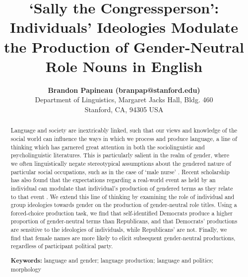 \documentclass[10pt,letterpaper]{article}
\title{`Sally the Congressperson': Individuals' Ideologies Modulate the Production of Gender-Neutral Role Nouns in English}
\author{{\large \bf Brandon Papineau (branpap@stanford.edu)} \\
	Department of Linguistics, Margaret Jacks Hall, Bldg. 460\\
	Stanford, CA, 94305 USA}
\begin{document}
	
	\maketitle
	
	\begin{abstract}
		Language and society are inextricably linked, such that our views and knowledge of the social world can influence the ways in which we process and produce language, a line of thinking which has garnered great attention in both the sociolinguistic and psycholinguistic literatures. This is particularly salient in the realm of gender, where we often linguistically negate stereotypical assumptions about the gendered nature of particular social occupations, such as in the case of `male nurse' \parencite{hellinger2001english}. Recent scholarship has also found that the expectations regarding a real-world event as held by an individual can modulate that individual's production of gendered terms as they relate to that event \parencite{von2020implicit,pozniak2021failures}. We extend this line of thinking by examining the role of individual and group ideologies towards gender on the production of gender-neutral role titles. Using a forced-choice production task, we find that self-identified Democrats produce a higher proportion of gender-neutral terms than Republicans, and that Democrats' productions are sensitive to the ideologies of individuals, while Republicans' are not. Finally, we find that female names are more likely to elicit subsequent gender-neutral productions, regardless of participant political party.  
		
		\textbf{Keywords:} 
		language and gender; language production; language and politics; morphology
	\end{abstract}
	
	
\end{document}
